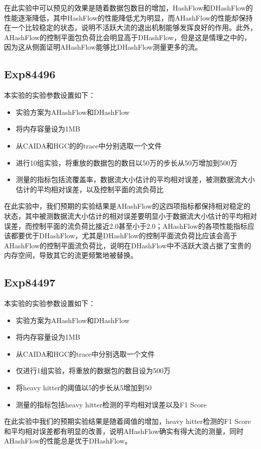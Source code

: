 \documentclass{article}
\begin{document}
在此实验中可以预见的效果是随着数据包数目的增加，HashFlow和DHashFlow的性能逐渐降低，其中HashFlow的性能降低尤为明显，而AHashFlow的性能却保持在一个比较稳定的状态，说明不活跃大流的退出机制能够发挥良好的作用。此外，AHashFlow的控制平面包负荷比会明显高于DHashFlow，但是这是情理之中的，因为这从侧面证明AHashFlow能够比DHashFlow测量更多的流。

\subsection{Exp84496}
本实验的实验参数设置如下：
\begin{itemize}
\item 实验方案为AHashFlow和DHashFlow
\item 将内存容量设为1MB
\item 从CAIDA和HGC的的trace中分别选取一个文件
\item 进行10组实验，将重放的数据包的数目以50万的步长从50万增加到500万
\item 测量的指标包括流覆盖率，数据流大小估计的平均相对误差，被测数据流大小估计的平均相对误差，以及控制平面的流负荷比
\end{itemize}

在此实验中，我们预期的实验结果是AHashFlow的这四项指标都保持相对稳定的状态，其中被测数据流大小估计的相对误差要明显小于数据流大小估计的平均相对误差，而控制平面的流负荷比接近2.0甚至小于2.0；AHashFlow的各项性能指标应该都要优于DHashFlow，尤其是DHashFlow的控制平面流负荷比应该会高于AHashFlow的控制平面流负荷比，说明在DHashFlow中不活跃大浪占据了宝贵的内存空间，导致其它的流更频繁地被替换。

\subsection{Exp84497}
本实验的实验参数设置如下：
\begin{itemize}
\item 实验方案为AHashFlow和DHashFlow
\item 将内存容量设为1MB
\item 从CAIDA和HGC的trace中分别选取一个文件
\item 仅进行1组实验，将重放的数据包的数目设为500万
\item 将heavy hitter的阈值以5的步长从5增加到50
\item 测量的指标包括heavy hitter检测的平均相对误差以及F1 Score
\end{itemize}

在此实验中我们的预期实验结果是随着阈值的增加，heavy hitter检测的F1 Score和平均相对误差都有明显的改善，说明AHashFlow确实有得大流的测量，同时AHashFlow的性能总是优于DHashFlow。
\end{document}
